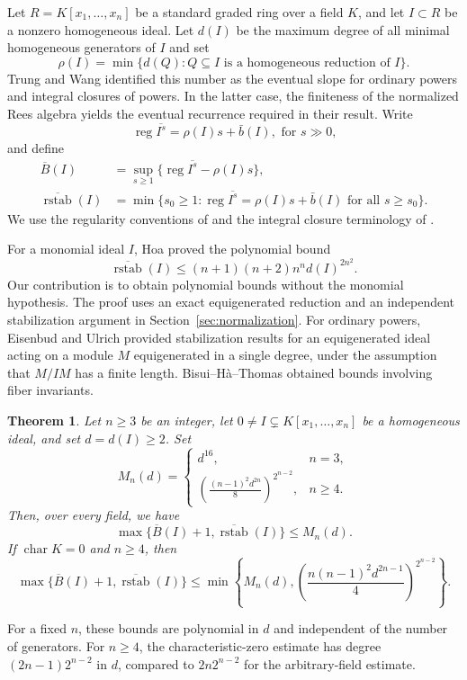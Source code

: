 \documentclass[12pt]{amsart}
\numberwithin{equation}{section}
\newtheorem{theorem}{Theorem}[section]
\theoremstyle{definition}
\theoremstyle{remark}
\numberwithin{equation}{section}
\DeclareMathOperator{\reg}{reg}
\newcommand{\Bn}{\overline B}
\newcommand{\rstabn}{\overline{\operatorname{rstab}}}
\begin{document}
Let $R=K[x_1,\ldots,x_n]$ be a  standard graded  ring over a field $K$, and let  $ I\subset R$
be  a nonzero homogeneous ideal.  Let $d(I)$  be the maximum degree of all minimal homogeneous generators of $I$ and set
\[
\rho(I)=\min\{d(Q):Q\subseteq I
\text{ is a homogeneous reduction  of $I$}\}.
\]
Trung and Wang  \cite[Corollaries~3.3 and~3.4]{TW}  identified this number as the eventual slope for ordinary powers and integral
closures of powers. In the latter case,  the finiteness of the normalized Rees algebra  yields the eventual recurrence required in their result.
Write
\[
\reg\overline{I^s}=\rho(I)s+\bar b(I),  \text{ for $s\gg0$,}
\]
and define
\[
\begin{split}
	\Bn(I)&=\sup_{s\ge1}
	\{\reg\overline{I^s}-\rho(I)s\},\\
	\rstabn(I)&=\min\{s_0\ge1:
	\reg\overline{I^s}=\rho(I)s+\bar b(I)
	\text{ for all\ }s\ge s_0\}.
\end{split}
\]
We use the regularity conventions of \cite{Eis} and the integral closure terminology of \cite{HS}.

For a monomial ideal $I$, Hoa \cite[Theorem~3.13]{HoaIP}  proved the polynomial bound
\[
\rstabn(I)\le(n+1)(n+2)n^n d(I)^{2n^2}.
\]
Our contribution is to obtain polynomial bounds without the  monomial hypothesis. The proof uses an exact equigenerated
reduction and an independent stabilization argument in Section~\ref{sec:normalization}. For ordinary powers, Eisenbud and Ulrich    \cite{EU} provided stabilization results for an equigenerated ideal acting on a module $M$ equigenerated in a single degree,
under the assumption that $M/IM$ has a finite length. Bisui--H\`a--Thomas \cite{BHT} obtained bounds involving fiber invariants.

\begin{theorem}\label{thm:main}
Let $n \ge 3$ be an integer, let $0 \neq I \subsetneq K[x_1, \ldots, x_n]$ be a homogeneous ideal, and set $d=d(I)\ge2$.   Set
	\[
	M_n(d)=
	\begin{cases}
		d^{16},&n=3,\\[2mm]
		\displaystyle\left(\frac{(n-1)^2d^{2n}}8\right)^{2^{n-2}},&n\ge4.
	\end{cases}
	\]
	Then, over every field,  we have
	\[
	\max\{\Bn(I)+1,\rstabn(I)\}\le M_n(d).
	\]
	If $\operatorname{char}K=0$ and $n\ge4$, then
	\[
	\max\{\Bn(I)+1,\rstabn(I)\}
	\le\min\left\{M_n(d),
	\left(\frac{n(n-1)^2d^{2n-1}}4\right)^{2^{n-2}}\right\}.
	\]
\end{theorem}

For a fixed $n$, these bounds are polynomial in $d$ and independent of the number of generators. For $n\ge4$, the characteristic-zero estimate has degree $(2n-1)2^{n-2}$ in $d$,  compared to $2n2^{n-2}$ for the  arbitrary-field estimate.
\end{document}
